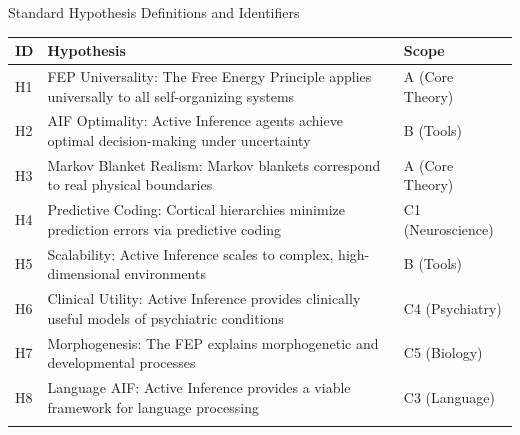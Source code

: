 \documentclass[
  ignorenonframetext,
]{beamer}
\newcounter{none} %
\begin{document}
\begin{frame}{Standard Hypothesis Definitions and Identifiers}
\protect{}\label{standard-hypothesis-definitions-and-identifiers}
{\def\LTcaptype{none} %
\begin{longtable}[]{@{}
  >{\raggedright\arraybackslash}p{}
  >{\raggedright\arraybackslash}p{}
  >{\raggedright\arraybackslash}p{}@{}}
\toprule\noalign{}
\begin{minipage}[b]{\linewidth}\raggedright
ID
\end{minipage} & \begin{minipage}[b]{\linewidth}\raggedright
Hypothesis
\end{minipage} & \begin{minipage}[b]{\linewidth}\raggedright
Scope
\end{minipage} \\
\midrule\noalign{}
\endhead
H1 & FEP Universality: The Free Energy Principle applies universally to
all self-organizing systems & A (Core Theory) \\
H2 & AIF Optimality: Active Inference agents achieve optimal
decision-making under uncertainty & B (Tools) \\
H3 & Markov Blanket Realism: Markov blankets correspond to real physical
boundaries & A (Core Theory) \\
H4 & Predictive Coding: Cortical hierarchies minimize prediction errors
via predictive coding & C1 (Neuroscience) \\
H5 & Scalability: Active Inference scales to complex, high-dimensional
environments & B (Tools) \\
H6 & Clinical Utility: Active Inference provides clinically useful
models of psychiatric conditions & C4 (Psychiatry) \\
H7 & Morphogenesis: The FEP explains morphogenetic and developmental
processes & C5 (Biology) \\
H8 & Language AIF: Active Inference provides a viable framework for
language processing & C3 (Language) \\
\bottomrule\noalign{}
\end{longtable}
}
\end{frame}
\end{document}
